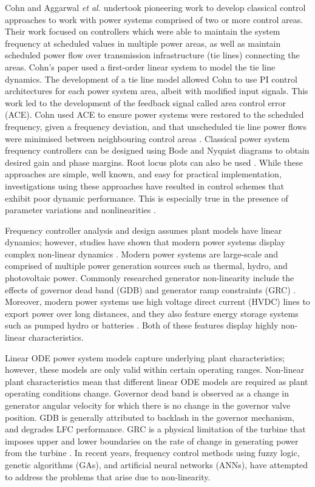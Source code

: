 Cohn \cite{Cohn1971} and Aggarwal \textit{et al.} \cite{Aggarwal1968, Aggarwal1968a} undertook pioneering work to develop classical control approaches to work with power systems comprised of two or more control areas. Their work focused on controllers which were able to maintain the system frequency at scheduled values in multiple power areas, as well as maintain scheduled power flow over transmission infrastructure (tie lines) connecting the areas. Cohn's paper used a first-order linear system to model the tie line dynamics. The development of a tie line model allowed Cohn to use PI control architectures for each power system area, albeit with modified input signals. This work led to the development of the feedback signal called area control error (ACE). Cohn used ACE to ensure power systems were restored to the scheduled frequency, given a frequency deviation, and that unscheduled tie line power flows were minimised between neighbouring control areas \cite{Cohn1956}. Classical power system frequency controllers can be designed using Bode and Nyquist diagrams to obtain desired gain and phase margins. Root locus plots can also be used \cite{Ogat2010}. While these approaches are simple, well known, and easy for practical implementation, investigations using these approaches have resulted in control schemes that exhibit poor dynamic performance. This is especially true in the presence of parameter variations and nonlinearities \cite{Kundur1994, Elgerd1970, Bechert1977}.

Frequency controller analysis and design assumes plant models have linear dynamics; however, studies have shown that modern power systems display complex non-linear dynamics \cite{Concordia1957, Kwatny1975, Elgerd1994, Morsali2014}. Modern power systems are large-scale and comprised of multiple power generation sources such as thermal, hydro, and photovoltaic power. Commonly researched generator non-linearity include the effects of governor dead band (GDB) \cite{Concordia1957} and generator ramp constraints (GRC) \cite{Kwatny1975, Elgerd1994}. Moreover, modern power systems use high voltage direct current (HVDC) lines to export power over long distances, and they also feature energy storage systems such as pumped hydro or batteries \cite{Bevrani2011, Glover2012, Kothari2011, Kundur1994}. Both of these features display highly non-linear characteristics.

Linear ODE power system models capture underlying plant characteristics; however, these models are only valid within certain operating ranges. Non-linear plant characteristics mean that different linear ODE models are required as plant operating conditions change. Governor dead band is observed as a change in generator angular velocity for which there is no change in the governor valve position. GDB is generally attributed to backlash in the governor mechanism, and degrades LFC performance. GRC is a physical limitation of the turbine that imposes upper and lower boundaries on the rate of change in generating power from the turbine \cite{Morsali2014}. In recent years, frequency control methods using fuzzy logic, genetic algorithms (GAs), and artificial neural networks (ANNs), have attempted to address the problems that arise due to non-linearity.

